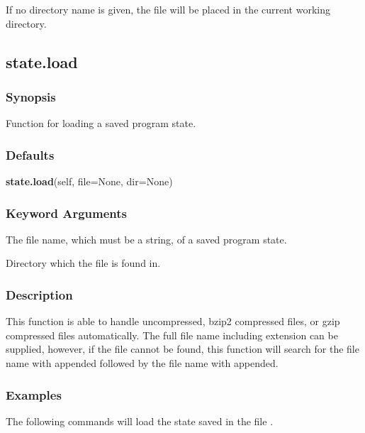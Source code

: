 If no directory name is given, the file will be placed in the current working directory.


\newpage

\subsection{state.load}


\subsubsection{Synopsis}

Function for loading a saved program state.

\subsubsection{Defaults}

\textsf{\textbf{state.load}(self, file=None, dir=None)}


\subsubsection{Keyword Arguments}


  The file name, which must be a string, of a saved program state.

  Directory which the file is found in.

\subsubsection{Description}

This function is able to handle uncompressed, bzip2 compressed files, or gzip compressed
files automatically.  The full file name including extension can be supplied, however, if
the file cannot be found, this function will search for the file name with 
 appended
followed by the file name with 
 appended.


\subsubsection{Examples}

The following commands will load the state saved in the file 
.





